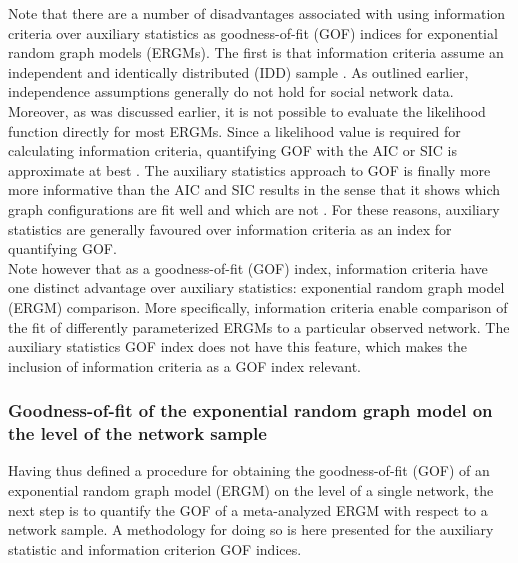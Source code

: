 \documentclass[a4paper, man]{apa6}
\begin{document}
Note that there are a number of disadvantages associated with using information criteria over auxiliary statistics as goodness-of-fit (GOF) indices for exponential random graph models (ERGMs). The first is that information criteria assume an independent and identically distributed (IDD) sample \cite{wit2012all}. As outlined earlier, independence assumptions generally do not hold for social network data. Moreover, as was discussed earlier, it is not possible to evaluate the likelihood function directly for most ERGMs. Since a likelihood value is required for calculating information criteria, quantifying GOF with the AIC or SIC is approximate at best \cite{wit2012all}. The auxiliary statistics approach to GOF is finally more more informative than the AIC and SIC results in the sense that it shows which graph configurations are fit well and which are not \cite{wit2012all}. For these reasons, auxiliary statistics are generally favoured over information criteria as an index for quantifying GOF. 
\\
Note however that as a goodness-of-fit (GOF) index, information criteria have one distinct advantage over auxiliary statistics: exponential random graph model (ERGM) comparison. More specifically, information criteria enable comparison of the fit of differently parameterized ERGMs to a particular observed network. The auxiliary statistics GOF index does not have this feature, which makes the inclusion of information criteria as a GOF index relevant. 
\\
\subsubsection{Goodness-of-fit of the exponential random graph model on the level of the network sample}
Having thus defined a procedure for obtaining the goodness-of-fit (GOF) of an exponential random graph model (ERGM) on the level of a single network, the next step is to quantify the GOF of a meta-analyzed ERGM with respect to a network sample. A methodology for doing so is here presented for the auxiliary statistic and information criterion GOF indices. 
\\
\end{document}
